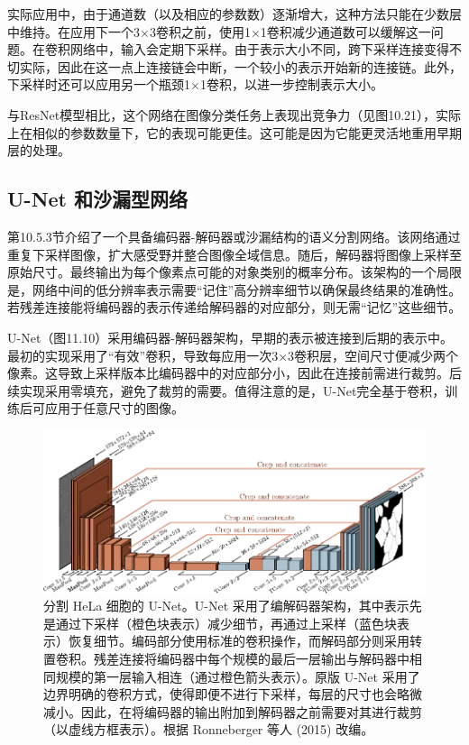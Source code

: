 \documentclass[lang=cn,newtx,10pt,scheme=chinese]{elegantbook}
\begin{document}
实际应用中，由于通道数（以及相应的参数数）逐渐增大，这种方法只能在少数层中维持。在应用下一个3×3卷积之前，使用1×1卷积减少通道数可以缓解这一问题。在卷积网络中，输入会定期下采样。由于表示大小不同，跨下采样连接变得不切实际，因此在这一点上连接链会中断，一个较小的表示开始新的连接链。此外，下采样时还可以应用另一个瓶颈1×1卷积，以进一步控制表示大小。

与ResNet模型相比，这个网络在图像分类任务上表现出竞争力（见图10.21），实际上在相似的参数数量下，它的表现可能更佳。这可能是因为它能更灵活地重用早期层的处理。

\subsection{U-Net 和沙漏型网络}
第10.5.3节介绍了一个具备编码器-解码器或沙漏结构的语义分割网络。该网络通过重复下采样图像，扩大感受野并整合图像全域信息。随后，解码器将图像上采样至原始尺寸。最终输出为每个像素点可能的对象类别的概率分布。该架构的一个局限是，网络中间的低分辨率表示需要“记住”高分辨率细节以确保最终结果的准确性。若残差连接能将编码器的表示传递给解码器的对应部分，则无需“记忆”这些细节。

U-Net（图11.10）采用编码器-解码器架构，早期的表示被连接到后期的表示中。最初的实现采用了“有效”卷积，导致每应用一次3×3卷积层，空间尺寸便减少两个像素。这导致上采样版本比编码器中的对应部分小，因此在连接前需进行裁剪。后续实现采用零填充，避免了裁剪的需要。值得注意的是，U-Net完全基于卷积，训练后可应用于任意尺寸的图像。

\begin{figure}[ht!]
\centering
\includegraphics[width=0.7\linewidth]{PDFFigures/UDLChap11PDF/ResidualUNet.pdf}
\caption{分割 HeLa 细胞的 U-Net。U-Net 采用了编解码器架构，其中表示先是通过下采样（橙色块表示）减少细节，再通过上采样（蓝色块表示）恢复细节。编码部分使用标准的卷积操作，而解码部分则采用转置卷积。残差连接将编码器中每个规模的最后一层输出与解码器中相同规模的第一层输入相连（通过橙色箭头表示）。原版 U-Net 采用了边界明确的卷积方式，使得即便不进行下采样，每层的尺寸也会略微减小。因此，在将编码器的输出附加到解码器之前需要对其进行裁剪（以虚线方框表示）。根据 Ronneberger 等人 (2015) 改编。}
\end{figure}
\end{document}
